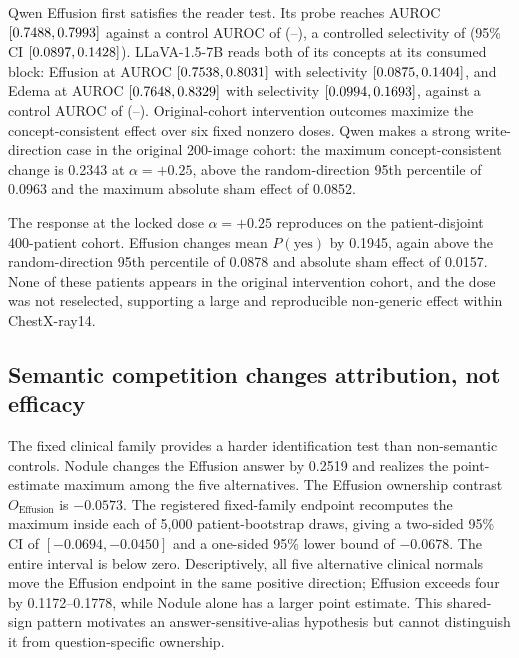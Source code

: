 \documentclass{article}
\begin{document}
Qwen Effusion first satisfies the reader test. Its probe reaches AUROC \cfSeedDecQwenEffAuroc{} $[0.7488,0.7993]$ against a control AUROC of \cfSeedDecQwenEffCtrl{} (\cfSeedDecQwenEffCtrlLo--\cfSeedDecQwenEffCtrlHi), a controlled selectivity of \cfSeedDecQwenEffSel{} (95\% CI $[0.0897,0.1428]$). LLaVA-1.5-7B reads both of its concepts at its consumed block: Effusion at AUROC \cfSeedDecLlavaEffAuroc{} $[0.7538,0.8031]$ with selectivity \cfSeedDecLlavaEffSel{} $[0.0875,0.1404]$, and Edema at AUROC \cfSeedDecLlavaEdemaAuroc{} $[0.7648,0.8329]$ with selectivity \cfSeedDecLlavaEdemaSel{} $[0.0994,0.1693]$, against a control AUROC of \cfSeedDecLlavaEffCtrl{} (\cfSeedDecLlavaEffCtrlLo--\cfSeedDecLlavaEffCtrlHi). Original-cohort intervention outcomes maximize the concept-consistent effect over six fixed nonzero doses. Qwen makes a strong write-direction case in the original 200-image cohort: the maximum concept-consistent change is 0.2343 at $\alpha=+0.25$, above the random-direction 95th percentile of 0.0963 and the maximum absolute sham effect of 0.0852.

The response at the locked dose $\alpha=+0.25$ reproduces on the patient-disjoint 400-patient cohort. Effusion changes mean $P(\mathrm{yes})$ by 0.1945, again above the random-direction 95th percentile of 0.0878 and absolute sham effect of 0.0157. None of these patients appears in the original intervention cohort, and the dose was not reselected, supporting a large and reproducible non-generic effect within ChestX-ray14.


\subsection{Semantic competition changes attribution, not efficacy}
\label{sec:specificity-results}

The fixed clinical family provides a harder identification test than non-semantic controls. Nodule changes the Effusion answer by 0.2519 and realizes the point-estimate maximum among the five alternatives. The Effusion ownership contrast $O_{\mathrm{Effusion}}$ is $-0.0573$. The registered fixed-family endpoint recomputes the maximum inside each of 5,000 patient-bootstrap draws, giving a two-sided 95\% CI of $[-0.0694,-0.0450]$ and a one-sided 95\% lower bound of $-0.0678$. The entire interval is below zero. Descriptively, all five alternative clinical normals move the Effusion endpoint in the same positive direction; Effusion exceeds four by 0.1172--0.1778, while Nodule alone has a larger point estimate. This shared-sign pattern motivates an answer-sensitive-alias hypothesis but cannot distinguish it from question-specific ownership.
\end{document}
